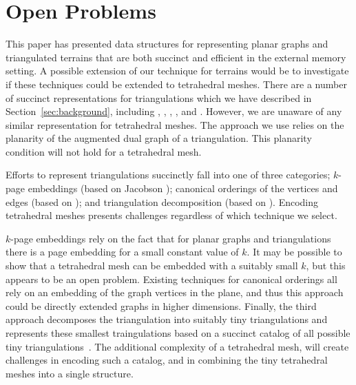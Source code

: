 

\section{Open Problems}\label{sec:open_problems}

This paper has presented data structures for representing planar graphs 
and triangulated terrains that are both succinct and efficient in the
external memory setting.
A possible extension of our technique for terrains would be to 
investigate if these techniques could be extended to tetrahedral meshes.
There are a number of succinct representations for triangulations which 
we have described in Section~\ref{sec:background}, including 
\cite{chuang_et_al_1998}, \cite{DBLP:conf/walcom/YamanakaN08}, 
\cite{DBLP:conf/isaac/BarbayAHM07}, \cite{DBLP:conf/wads/AleardiDS05}, 
and \cite{DBLP:journals/tcs/AleardiDS08}.
However, we are unaware of any similar representation for tetrahedral
meshes.
The approach we use relies on the planarity of the augmented dual graph
of a triangulation. 
This planarity condition will not hold for a tetrahedral mesh.

Efforts to represent triangulations succinctly fall into one of three
categories; $k$-page embeddings (based on Jacobson \cite{jac_1989}); 
canonical orderings of the vertices and edges (based 
on \cite{chuang_et_al_1998}); and triangulation
decomposition (based on \cite{DBLP:conf/wads/AleardiDS05}).
Encoding tetrahedral meshes presents challenges regardless of
which technique we select.

$k$-page embeddings rely on the fact that for planar graphs and
triangulations there is a page embedding for a small constant 
value of $k$.
It may be possible to show that a tetrahedral mesh can be 
embedded with a suitably small $k$, but this appears to be 
an open problem. 
Existing techniques for canonical orderings all rely on 
an embedding of the graph vertices in the plane, and thus 
this approach could be directly extended graphs in
higher dimensions.
Finally, the third approach decomposes the triangulation into suitably 
tiny triangulations
and represents these smallest traingulations based on a succinct
catalog of all possible tiny 
triangulations~\cite{DBLP:conf/wads/AleardiDS05}.
The additional complexity of a tetrahedral mesh, will create 
challenges in encoding such a catalog, and in combining the 
tiny tetrahedral meshes into a single structure.

